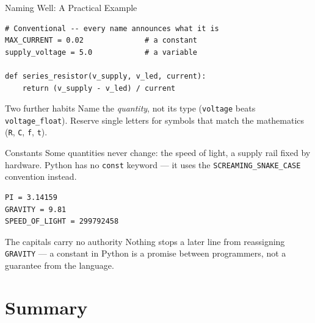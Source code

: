 \documentclass[9pt,aspectratio=169,xcolor=table]{beamer}
\begin{document}
\begin{frame}[fragile]{Naming Well: A Practical Example}
    \leavevmode
\begin{lstlisting}
# Conventional -- every name announces what it is
MAX_CURRENT = 0.02              # a constant
supply_voltage = 5.0            # a variable

def series_resistor(v_supply, v_led, current):
    return (v_supply - v_led) / current
\end{lstlisting}

    \vspace{2mm}
    \begin{block}{Two further habits}
        Name the \emph{quantity}, not its type (\texttt{voltage} beats
        \texttt{voltage\_float}). Reserve single letters for symbols
        that match the mathematics (\texttt{R}, \texttt{C}, \texttt{f},
        \texttt{t}).
    \end{block}
\end{frame}

\begin{frame}[fragile]{Constants}
    \leavevmode
    Some quantities never change: the speed of light, a supply rail
    fixed by hardware. Python has no \texttt{const} keyword --- it uses
    the \texttt{SCREAMING\_SNAKE\_CASE} convention instead.

\begin{lstlisting}
PI = 3.14159
GRAVITY = 9.81
SPEED_OF_LIGHT = 299792458
\end{lstlisting}

    \vspace{2mm}
    \begin{alertblock}{The capitals carry no authority}
        Nothing stops a later line from reassigning \texttt{GRAVITY} ---
        a constant in Python is a \alert{promise between programmers},
        not a guarantee from the language.
    \end{alertblock}
\end{frame}

\section{Summary}
\end{document}
